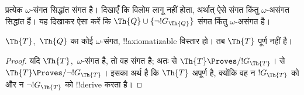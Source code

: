 \documentclass[../../../include/open-logic-section]{subfiles}
\begin{document}
\begin{prob}
  प्रत्येक $\omega$-संगत सिद्धांत संगत है। दिखाएँ कि विलोम लागू नहीं होता,
  अर्थात् ऐसे संगत किंतु $\omega$-असंगत सिद्धांत हैं। यह दिखाकर ऐसा करें
  कि $\Th{Q} \cup \{\lnot !G_\Th{Q}\}$ संगत किंतु $\omega$-असंगत है।
\end{prob}

\begin{thm}
 $\Th{T}$,~$\Th{Q}$ का कोई
$\omega$-संगत, !!{axiomatizable} विस्तार हो। तब $\Th{T}$ पूर्ण नहीं है।
\end{thm}

\begin{proof}
  यदि $\Th{T}$,~$\omega$-संगत है, तो वह संगत है; अतः
   से $\Th{T} \Proves/ !G_\Th{T}$।
   से
  $\Th{T} \Proves/ \lnot !G_\Th{T}$। इसका अर्थ है कि $\Th{T}$ अपूर्ण है,
  क्योंकि वह न $!G_\Th{T}$ को और न $\lnot !G_\Th{T}$ को !!{derive} करता
  है।
\end{proof}
\end{document}

